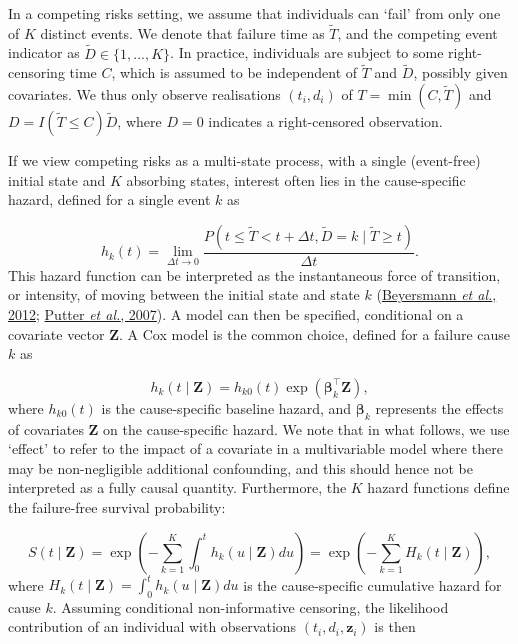 \documentclass[
  letterpaper,
  DIV=11,
  numbers=noendperiod]{scrreprt}
\begin{document}
In a competing risks setting, we assume that individuals can `fail' from
only one of \(K\) distinct events. We denote that failure time as
\(\tilde{T}\), and the competing event indicator as
\(\tilde{D} \in \{1,...,K\}\). In practice, individuals are subject to
some right-censoring time \(C\), which is assumed to be independent of
\(\tilde{T}\) and \(\tilde{D}\), possibly given covariates. We thus only
observe realisations \((t_i, d_i)\) of \(T = \min(C,\tilde{T})\) and
\(D = I(\tilde{T} \leq C)\tilde{D}\), where \(D = 0\) indicates a
right-censored observation.

If we view competing risks as a multi-state process, with a single
(event-free) initial state and \(K\) absorbing states, interest often
lies in the cause-specific hazard, defined for a single event \(k\) as

\begin{equation*}
    h_k(t) = \lim_{\Delta t \to 0} \frac{P(t \leq \tilde{T} < t + \Delta t, \tilde{D} = k \mid \tilde{T} \geq t)}{\Delta t}.
\end{equation*} This hazard function can be interpreted as the
instantaneous force of transition, or intensity, of moving between the
initial state and state \(k\)
(\protect\hyperlink{ref-beyersmannCompetingRisksMultistate2012}{Beyersmann
\emph{et al.}, 2012};
\protect\hyperlink{ref-putterTutorialBiostatisticsCompeting2007}{Putter
\emph{et al.}, 2007}). A model can then be specified, conditional on a
covariate vector \(\mathbf{Z}\). A Cox model is the common choice,
defined for a failure cause \(k\) as

\begin{equation*}
    h_k(t \mid \mathbf{Z}) = h_{k0}(t)\exp(\boldsymbol{\beta}_k^\intercal \mathbf{Z}),
\end{equation*} where \(h_{k0}(t)\) is the cause-specific baseline
hazard, and \(\boldsymbol{\beta}_k\) represents the effects of
covariates \(\mathbf{Z}\) on the cause-specific hazard. We note that in
what follows, we use `effect' to refer to the impact of a covariate in a
multivariable model where there may be non-negligible additional
confounding, and this should hence not be interpreted as a fully causal
quantity. Furthermore, the \(K\) hazard functions define the
failure-free survival probability:

\begin{equation*}
    S(t \mid \mathbf{Z}) = \exp \left( - \sum_{k = 1}^{K} \int_{0}^{t} h_k(u \mid \mathbf{Z})du \right)
        = \exp \left( - \sum_{k = 1}^{K} H_k(t \mid \mathbf{Z}) \right),
\end{equation*} where
\(H_k(t \mid \mathbf{Z}) = \int_{0}^{t} h_k(u \mid \mathbf{Z})du\) is
the cause-specific cumulative hazard for cause \(k\). Assuming
conditional non-informative censoring, the likelihood contribution of an
individual with observations \((t_i, d_i, \mathbf{z}_i)\) is then
\end{document}

